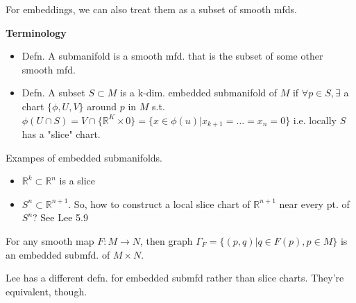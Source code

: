 \documentclass[12pt,letterpaper]{article}
\begin{document}
For embeddings, we can also treat them as a subset of smooth mfds. 

\textbf{Terminology}
\begin{itemize}
    \item Defn. A submanifold is a smooth mfd. that is the subset of some other smooth mfd. 
    \item Defn. A subset $ S \subset M$ is a k-dim. embedded submanifold of $M$ if $\forall p \in S, \exists $ a chart $\{\phi, U, V\}$ around $p$ in $M$ s.t. $\phi(U \cap S) = V \cap \{ \mathbb{R}^K \times 0 \} = \{ x \in \phi(u) | x_{k+1} = \dots =x_n=0 \}$  i.e. locally $S$ has a "slice" chart. 
\end{itemize}

Exampes of embedded submanifolds. 
\begin{itemize}
    \item $\mathbb{R}^k \subset \mathbb{R}^n$ is a slice
    \item $S^n \subset \mathbb{R}^{n+1}$. So, how to construct a local slice chart of $\mathbb{R}^{n+1}$ near every pt. of $S^n$? See Lee 5.9
\end{itemize}

For any smooth map $F: M \rightarrow N$, then graph $\Gamma_F = \{ (p, q) | q \in F(p), p \in M \}$ is an embedded submfd. of $M \times N$.

Lee has a different defn. for embedded submfd rather than slice charts. They're equivalent, though.
\end{document}
